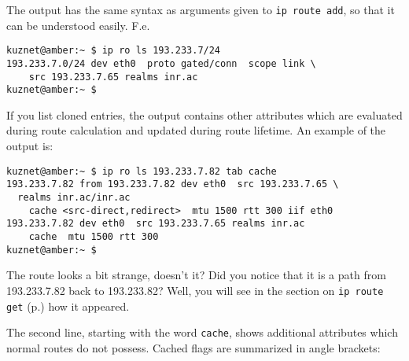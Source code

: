 The output has the same syntax as arguments given to {\tt ip route add},
so that it can be understood easily. F.e.\
\begin{verbatim}
kuznet@amber:~ $ ip ro ls 193.233.7/24
193.233.7.0/24 dev eth0  proto gated/conn  scope link \
    src 193.233.7.65 realms inr.ac 
kuznet@amber:~ $
\end{verbatim}

If you list cloned entries, the output contains other attributes which
are evaluated during route calculation and updated during route
lifetime. An example of the output is:
\begin{verbatim}
kuznet@amber:~ $ ip ro ls 193.233.7.82 tab cache
193.233.7.82 from 193.233.7.82 dev eth0  src 193.233.7.65 \
  realms inr.ac/inr.ac 
    cache <src-direct,redirect>  mtu 1500 rtt 300 iif eth0
193.233.7.82 dev eth0  src 193.233.7.65 realms inr.ac 
    cache  mtu 1500 rtt 300
kuznet@amber:~ $
\end{verbatim}
\begin{NB}
  \label{NB-strange-route}
  The route looks a bit strange, doesn't it? Did you notice that
  it is a path from 193.233.7.82 back to 193.233.82? Well, you will
  see in the section on \verb|ip route get| (p.\pageref{NB-nature-of-strangeness})
  how it appeared.
\end{NB}
The second line, starting with the word \verb|cache|, shows
additional attributes which normal routes do not possess.
Cached flags are summarized in angle brackets:
